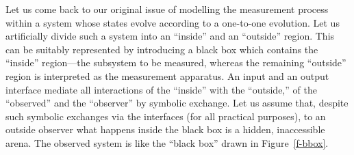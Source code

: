 \documentclass[pra,amsfonts,twocolumn]{revtex4}
\begin{document}
Let us come back to our original issue of modelling the measurement
process within a system whose states evolve according  to a one-to-one
evolution.
Let us artificially divide such a system into an ``inside'' and an
``outside'' region.
This can be suitably represented by introducing a black box which
contains the ``inside'' region---the subsystem to be measured, whereas
the
remaining ``outside'' region is interpreted as the measurement
apparatus.
An input and an output interface mediate all interactions of the
``inside'' with the ``outside,'' of the ``observed'' and the
``observer'' by symbolic exchange. Let us assume that, despite such
symbolic exchanges via the interfaces
(for all practical purposes),
to an outside
observer
 what happens inside the black box is a hidden,
 inaccessible
  arena.
The observed system is like the ``black box'' drawn in
Figure~\ref{f-bbox}.
\end{document}
